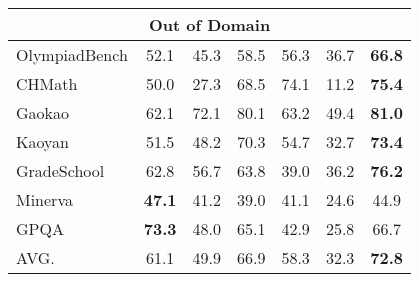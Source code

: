 \begin{table*}[ht]
\begin{tabularx}{\textwidth}{l c c c c c c}
        \midrule
        \multicolumn{7}{c}{Out of Domain} \\
        \midrule
        OlympiadBench & 52.1 & 45.3& 58.5  & 56.3 & 36.7 & \cellcolor[HTML]{dceffe} \textbf{66.8}\\
        CHMath & 50.0 & 27.3& 68.5  & 74.1 & 11.2 & \cellcolor[HTML]{dceffe} \textbf{75.4}\\
        Gaokao &62.1 & 72.1& 80.1  & 63.2 & 49.4 & \cellcolor[HTML]{dceffe} \textbf{81.0} \\
        Kaoyan & 51.5 & 48.2 & 70.3&54.7&32.7&\cellcolor[HTML]{dceffe} \textbf{73.4}\\
        GradeSchool & 62.8&56.7 & 63.8 & 39.0 & 36.2 & \cellcolor[HTML]{dceffe} \textbf{76.2} \\
        Minerva & \textbf{47.1} & 41.2& 39.0  & 41.1 & 24.6 & \cellcolor[HTML]{dceffe} 44.9\\
        GPQA &  \textbf{73.3} & 48.0& 65.1  & 42.9 & 25.8 & \cellcolor[HTML]{dceffe} 66.7\\
        \midrule
        AVG. & 61.1 & 49.9 & 66.9 & 58.3& 32.3 & \cellcolor[HTML]{dceffe} \textbf{72.8}\\
        \bottomrule
    \end{tabularx}
    \label{tab:main_results}
\end{table*}


